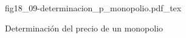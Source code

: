 \begin{figure}[h]
\centering
\def\svgwidth{0.5\textwidth}
{fig18_09-determinacion_p_monopolio.pdf_tex}
\caption{Determinación del precio de un monopolio}
\label{fig18_09-determinacion_p_monopolio}
\end{figure}